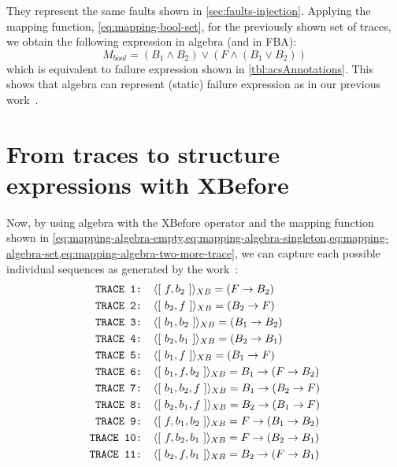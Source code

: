 They represent the same faults shown in \cref{sec:faults-injection}.
%
Applying the mapping function, \cref{eq:mapping-bool-set}, for the previously shown set of traces, we obtain the following expression in \ac{algebra} (and in \ac{FBA}):
%
\begin{equation}
M_{bool} = (B_1 \land B_2) \lor (F \land (B_1 \lor B_2))\label{eq:m-bool}
\end{equation}
%
which is equivalent to \possessiveembraer failure expression shown in \cref{tbl:acsAnnotations}.
%
This shows that \ac{algebra} can represent (static) failure expression as in our previous work~\cite{DM2012}.

\section{From traces to structure expressions with \acs*{XBefore}}
\label{sec:traces-to-structure-expressions-algebra-operators}

Now, by using \ac{algebra} with the \ac{XBefore} operator and the mapping function shown in \cref{eq:mapping-algebra-empty,eq:mapping-algebra-singleton,eq:mapping-algebra-set,eq:mapping-algebra-two-more-trace}, we can capture each possible individual sequences as generated by the work~\cite{DM2012}:
%
\begin{align*}
\text{\texttt{TRACE 1: }}&\langle{\ensuremath\left[~f,b_2~\right]}\rangle_{XB} = \left( F \rightarrow B_2 \right)\\
\text{\texttt{TRACE 2: }}&\langle{\ensuremath\left[~b_2,f~\right]}\rangle_{XB} = \left( B_2 \rightarrow F \right)\\
\text{\texttt{TRACE 3: }}&\langle{\ensuremath\left[~b_1,b_2~\right]}\rangle_{XB} = \left( B_1 \rightarrow B_2 \right)\\
\text{\texttt{TRACE 4: }}&\langle{\ensuremath\left[~b_2,b_1~\right]}\rangle_{XB} = \left( B_2 \rightarrow B_1 \right)\\
\text{\texttt{TRACE 5: }}&\langle{\ensuremath\left[~b_1,f~\right]}\rangle_{XB} = \left( B_1 \rightarrow F \right)\\
\text{\texttt{TRACE 6: }}&\langle{\ensuremath\left[~b_1,f,b_2~\right]}\rangle_{XB} = 
  B_1 \rightarrow \left(F \rightarrow B_2\right) \\
\text{\texttt{TRACE 7: }}&\langle{\ensuremath\left[~b_1,b_2,f~\right]}\rangle_{XB} = 
  B_1 \rightarrow \left(B_2 \rightarrow F\right) \\
\text{\texttt{TRACE 8: }}&\langle{\ensuremath\left[~b_2,b_1,f~\right]}\rangle_{XB} = 
  B_2 \rightarrow \left(B_1 \rightarrow F\right) \\
\text{\texttt{TRACE 9: }}&\langle{\ensuremath\left[~f,b_1,b_2~\right]}\rangle_{XB} = 
  F \rightarrow \left(B_1 \rightarrow B_2\right) \\
\text{\texttt{TRACE 10: }}&\langle{\ensuremath\left[~f,b_2,b_1~\right]}\rangle_{XB} = 
  F \rightarrow \left(B_2 \rightarrow B_1\right) \\
\text{\texttt{TRACE 11: }}&\langle{\ensuremath\left[~b_2,f,b_1~\right]}\rangle_{XB} = 
  B_2 \rightarrow \left(F \rightarrow B_1\right) 
\end{align*}


